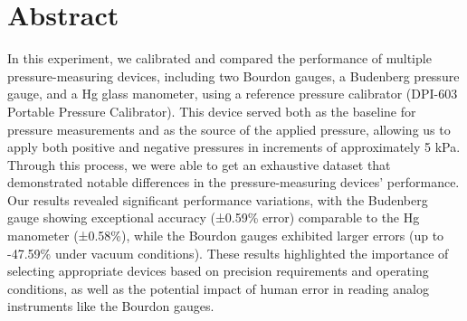 \documentclass{article}
\newcounter{dataset}
\begin{document}
\section{Abstract}
In this experiment, we calibrated and compared the performance of multiple pressure-measuring devices, including two Bourdon gauges, a Budenberg pressure gauge, and a Hg glass manometer, using a reference pressure calibrator (DPI-603 Portable Pressure Calibrator). This device served both as the baseline for pressure measurements and as the source of the applied pressure, allowing us to apply both positive and negative pressures in increments of approximately 5 kPa. Through this process, we were able to get an exhaustive dataset that demonstrated notable differences in the pressure-measuring devices' performance. Our results revealed significant performance variations, with the Budenberg gauge showing exceptional accuracy (±0.59\% error) comparable to the Hg manometer (±0.58\%), while the Bourdon gauges exhibited larger errors (up to -47.59\% under vacuum conditions). These results highlighted the importance of selecting appropriate devices based on precision requirements and operating conditions, as well as the potential impact of human error in reading analog instruments like the Bourdon gauges.

	
	\newpage\vspace*{-20pt}
\end{document}
